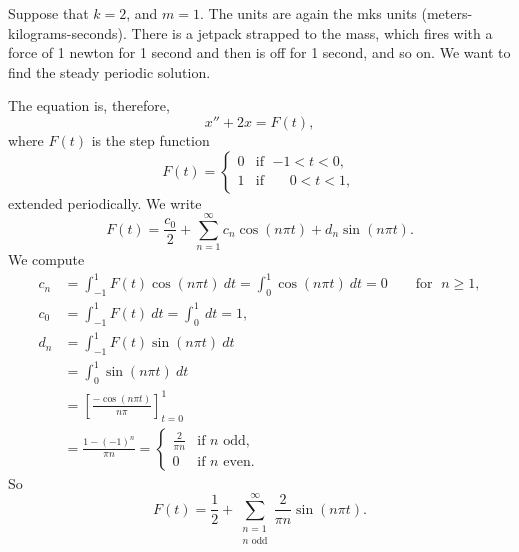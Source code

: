 \begin{example} \label{afs:steadyex}
Suppose that $k=2$, and $m=1$.
The units are again the mks units
(meters-kilograms-seconds).
There is a jetpack strapped to the mass, which fires with a force of 1
newton for 1
second and then is off for 1 second, and so on.  We want to find the steady periodic
solution.

The equation is, therefore,
\begin{equation*}
x'' + 2 x = F(t) ,
\end{equation*}
where $F(t)$ is the step function
\begin{equation*}
F(t) =
\begin{cases}
0 & \text{if } \; {-1} < t < 0 , \\
1 & \text{if } \; \phantom{-}0 < t < 1 ,
\end{cases}
\end{equation*}
extended periodically.
We write
\begin{equation*}
F(t) = \frac{c_0}{2} + \sum_{n=1}^\infty
c_n \cos (n \pi t) +
d_n \sin (n \pi t) .
\end{equation*}
We compute
\begin{align*}
c_n & = \int_{-1}^1 F(t) \cos (n \pi t) ~ dt = 
\int_{0}^1 \cos (n \pi t) ~ dt = 0 \qquad \text{for } \; n \geq 1,
\\
c_0 & = \int_{-1}^1 F(t) ~ dt = 
\int_{0}^1 ~ dt = 1 ,
\\
d_n & = \int_{-1}^1 F(t) \sin (n \pi t) ~ dt
\\
& = \int_{0}^1 \sin (n \pi t) ~ dt
\\
& = \left[ \frac{-\cos (n \pi t)}{n \pi} \right]_{t=0}^1
\\
& = \frac{1-{(-1)}^n}{\pi n} =
\begin{cases}
\frac{2}{\pi n} & \text{if } n \text{ odd} , \\
0 & \text{if } n \text{ even} .
\end{cases}
\end{align*}
So
\begin{equation*}
F(t) = \frac{1}{2} + \sum_{\substack{n=1 \\ n \text{ odd}}}^\infty
\frac{2}{\pi n} \sin (n \pi t) .
\end{equation*}


\end{example}
